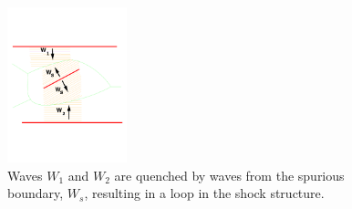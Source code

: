 \begin{figure}[!ht]
\centering
\includegraphics[width=0.31\textwidth]{figs/loop-waves.pdf}
\caption{ Waves $W_1$ and $W_2$ are quenched by waves from the spurious boundary, $W_s$, resulting in a loop in the shock structure. } 
\label{fig:loops}
\end{figure}




